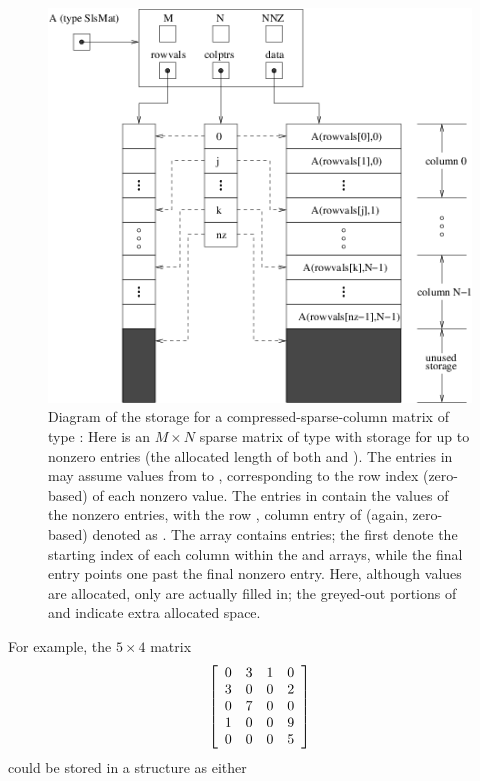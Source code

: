\documentclass[letterpaper,10pt,english]{sphinxmanual}
\begin{document}
\begin{figure}[htbp]
\centering
\capstart

\includegraphics{cscmat.png}
\caption{Diagram of the storage for a compressed-sparse-column matrix of
type {\hyperref[linear_solvers/SLS:c.SlsMat]{\emph{}}}: Here  is an \(M \times N\) sparse
matrix of type {\hyperref[linear_solvers/SLS:c.SlsMat]{\emph{}}} with storage for up to 
nonzero entries (the allocated length of both  and
).  The entries in  may assume values from
 to , corresponding to the row index (zero-based) of
each nonzero value.  The entries in  contain the values of
the nonzero entries, with the row , column  entry of
 (again, zero-based) denoted as .  The 
array contains  entries; the first  denote the starting
index of each column within the  and  arrays,
while the final entry points one past the final nonzero entry.
Here, although  values are allocated, only  are
actually filled in; the greyed-out portions of  and
 indicate extra allocated space.}\label{linear_solvers/SLS:sls-figure}\end{figure}

For example, the \(5\times 4\) matrix
\begin{gather}
\begin{split}\left[\begin{array}{cccc}
   0 & 3 & 1 & 0\\
   3 & 0 & 0 & 2\\
   0 & 7 & 0 & 0\\
   1 & 0 & 0 & 9\\
   0 & 0 & 0 & 5
\end{array}\right]\end{split}\notag
\end{gather}
could be stored in a {\hyperref[linear_solvers/SLS:c.SlsMat]{\emph{}}} structure as either
\end{document}
